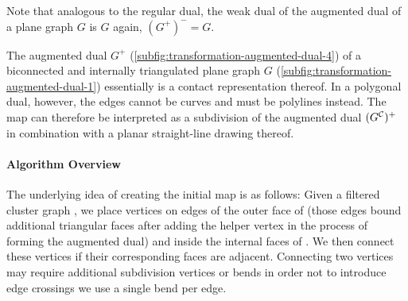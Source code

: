 Note that analogous to the regular dual, the weak dual of the augmented dual of a plane graph $G$ is $G$ again, \ie{} $(G^+)^- = G$.

The augmented dual $G^+$ (\cref{subfig:transformation-augmented-dual-4}) of a biconnected and internally triangulated plane graph $G$ (\cref{subfig:transformation-augmented-dual-1}) essentially is a contact representation thereof.
In a polygonal dual, however, the edges cannot be curves and must be polylines instead.
The map \initmap{} can therefore be interpreted as a subdivision of the augmented dual $(G^\mathcal{C}_{})^+$ in combination with a planar straight-line drawing thereof.



\paragraph{Algorithm Overview}

The underlying idea of creating the initial map \initmap{} is as follows:
Given a filtered cluster graph \clustergraph{}, we place vertices on edges of the outer face of \clustergraph{} (those edges bound additional triangular faces after adding the helper vertex in the process of forming the augmented dual) and inside the internal faces of \clustergraph{}.
We then connect these vertices if their corresponding faces are adjacent.
Connecting two vertices may require additional subdivision vertices or bends in order not to introduce edge crossings \emdash{} we use a single bend per edge.

